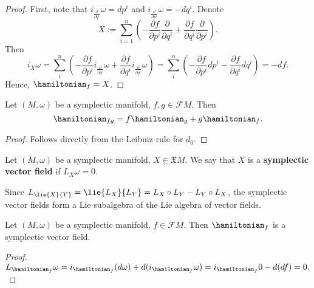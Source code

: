 \begin{proof}
  First, note that
  $i_{\frac{\partial}{\partial q^i}} \omega = d p^i$ and
  $i_{\frac{\partial}{\partial p^i}} \omega = - d q^i$.
  Denote
  \begin{equation}
    X
    := \sum_{i = 1}^n
    \left(
      - \frac{\partial f}{\partial p^i} \frac{\partial}{\partial q^i}
      + \frac{\partial f}{\partial q^i} \frac{\partial}{\partial p^i}
    \right).
  \end{equation}
  Then
  \begin{equation}
    i_X \omega
    = \sum_{i}^n
    \left(
      - \frac{\partial f}{\partial p^i} i_{\frac{\partial}{\partial q^i}} \omega
      + \frac{\partial f}{\partial q^i} i_{\frac{\partial}{\partial p^i}} \omega
    \right)
    = \sum_{i}^n
    \left(
      - \frac{\partial f}{\partial p^i} d p^i
      - \frac{\partial f}{\partial q^i} d q^i
    \right)
    = - d f.
  \end{equation}
  Hence, $\hamiltonian_f = X$.
\end{proof}
\begin{proposition}
  Let $(M, \omega)$ be a symplectic manifold, $f, g \in \mathcal{F} M$.
  Then
  \begin{equation}
    \hamiltonian_{f g} = f \hamiltonian_g + g \hamiltonian_f.
  \end{equation}
\end{proposition}
\begin{proof}
  Follows directly from the Leibniz rule for $d_0$.
\end{proof}
\begin{definition}
  Let $(M, \omega)$ be a symplectic manifold, $X \in \mathfrak{X} M$.
  We say that $X$ is a \textbf{symplectic vector field} if $L_X \omega = 0$.
\end{definition}
\begin{remark}
  Since $L_{\lie{X}{Y}} = \lie{L_X}{L_Y} = L_X \circ L_Y - L_Y \circ L_X$,
  the symplectic vector fields form a Lie subalgebra of the Lie algebra of
  vector fields.
\end{remark}
\begin{proposition}
  Let $(M, \omega)$ be a symplectic manifold, $f \in \mathcal{F} M$.
  Then $\hamiltonian_f$ is a symplectic vector field.
\end{proposition}
\begin{proof}
  $
    L_{\hamiltonian_f} \omega
    = i_{\hamiltonian_f}(d \omega) + d(i_{\hamiltonian_f} \omega)
    = i_{\hamiltonian_f} 0 - d(d f)
    = 0.
  $
\end{proof}

